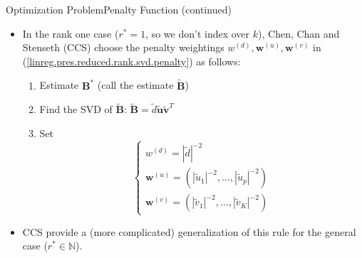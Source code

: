 \documentclass[notes]{beamer}       %
\begin{document}
\begin{frame}{Optimization Problem}{Penalty Function (continued)}
  \begin{itemize}
  \item{In the rank one case (\(r^*=1\), so we don't index over \(k\)), Chen, Chan and Stenseth (CCS) choose the penalty weightings \(w^{(d)}, \boldsymbol{w}^{(u)}, \boldsymbol{w}^{(v)}\) in (\ref{linreg.pres.reduced.rank.svd.penalty}) as follows:
  \begin{enumerate}
  \item Estimate \(\boldsymbol{B}^*\) (call the estimate \(\tilde{\boldsymbol{B}}\))
  \item Find the SVD of \(\tilde{\boldsymbol{B}}\): \(\tilde{\boldsymbol{B}} = \tilde{d}\tilde{\boldsymbol{u}}\tilde{\boldsymbol{v}}^T \)
  \item Set 
  \begin{equation}
  \begin{cases}
  w^{(d)} = |\tilde{d}|^{-2} \\
   \boldsymbol{w}^{(u)} = (|\tilde{u}_1|^{-2}, \ldots, |\tilde{u}_p|^{-2}) \\
    \boldsymbol{w}^{(v)} =   (|\tilde{v}_1|^{-2}, \ldots, |\tilde{v}_K|^{-2})
  \end{cases}
  \end{equation}
  \end{enumerate}
  
  }

  \item{CCS provide a (more complicated) generalization of this rule for the general case (\(r^* \in \mathbb{N}\)).
  }
  
    \end{itemize}
\end{frame}

\end{document}

